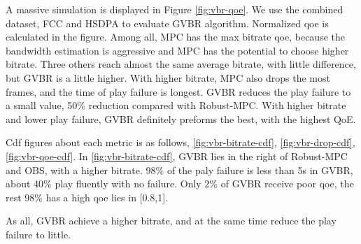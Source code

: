 A massive simulation is displayed in Figure \ref{fig:vbr-qoe}. We use the combined dataset, FCC and HSDPA to evaluate GVBR algorithm. Normalized qoe is calculated in the figure. Among all, MPC has the max bitrate qoe, because the bandwidth estimation is aggressive and MPC has the potential to choose higher bitrate. Three others reach almost the same average bitrate, with little difference, but GVBR is a little higher. With higher bitrate, MPC also drops the most frames, and the time of play failure is longest. GVBR reduces the play failure to a small value, 50\% reduction compared with Robust-MPC. With higher bitrate and lower play failure, GVBR definitely preforms the best, with the highest QoE.

Cdf figures about each metric is as follows, \ref{fig:vbr-bitrate-cdf}, \ref{fig:vbr-drop-cdf}, \ref{fig:vbr-qoe-cdf}. In \ref{fig:vbr-bitrate-cdf}, GVBR lies in the right of Robust-MPC and OBS, with a higher bitrate. $98\%$ of the paly failure is less than 5s in GVBR, about 40\% play fluently with no failure. Only 2\% of GVBR receive poor qoe, the rest 98\% has a high qoe lies in [0.8,1].

As all, GVBR achieve a higher bitrate, and at the same time reduce the play failure to little.
